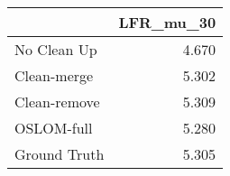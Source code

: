 \begin{tabular}{lr}
\toprule
{} & LFR_mu_30 \\
\midrule
No Clean Up  &     4.670 \\
Clean-merge  &     5.302 \\
Clean-remove &     5.309 \\
OSLOM-full   &     5.280 \\
Ground Truth &     5.305 \\
\bottomrule
\end{tabular}

